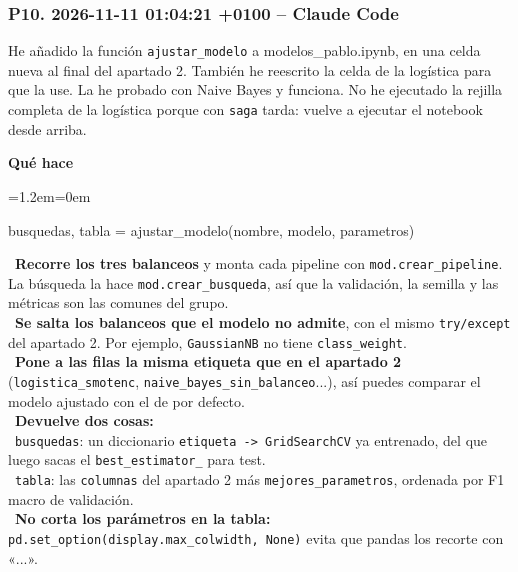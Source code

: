\documentclass[11pt,a4paper]{article}
\newenvironment{codigo}
  {\par\smallskip\begin{list}{}{\leftmargin=1.2em\rightmargin=0em}\item\relax\ttfamily\scriptsize\raggedright}
  {\end{list}\smallskip}
\begin{document}
\subsubsection*{P10. 2026-11-11 01:04:21 +0100 -- Claude Code}
{\small
He añadido la función \texttt{ajustar\_\allowbreak{}modelo} a modelos\_\allowbreak{}pablo.ipynb, en una celda nueva al final del apartado 2. También he reescrito la celda de la logística para que la use. La he probado con Naive Bayes y funciona. No he ejecutado la rejilla completa de la logística porque con \texttt{saga} tarda: vuelve a ejecutar el notebook desde arriba.

\smallskip\noindent\textbf{Qué hace}\par
\begin{codigo}
busquedas, tabla = ajustar\_\allowbreak{}modelo(nombre, modelo, parametros)
\end{codigo}
\hspace*{1.0em}\textbullet~\textbf{Recorre los tres balanceos} y monta cada pipeline con \texttt{mod.crear\_\allowbreak{}pipeline}. La búsqueda la hace \texttt{mod.crear\_\allowbreak{}busqueda}, así que la validación, la semilla y las métricas son las comunes del grupo. \\{}
\hspace*{1.0em}\textbullet~\textbf{Se salta los balanceos que el modelo no admite}, con el mismo \texttt{try/\allowbreak{}except} del apartado 2. Por ejemplo, \texttt{GaussianNB} no tiene \texttt{class\_\allowbreak{}weight}. \\{}
\hspace*{1.0em}\textbullet~\textbf{Pone a las filas la misma etiqueta que en el apartado 2} (\texttt{logistica\_\allowbreak{}smotenc}, \texttt{naive\_\allowbreak{}bayes\_\allowbreak{}sin\_\allowbreak{}balanceo}...), así puedes comparar el modelo ajustado con el de por defecto. \\{}
\hspace*{1.0em}\textbullet~\textbf{Devuelve dos cosas:} \\{}
\hspace*{2.0em}\textbullet~\texttt{busquedas}: un diccionario \texttt{etiqueta -\textgreater{} GridSearchCV} ya entrenado, del que luego sacas el \texttt{best\_\allowbreak{}estimator\_\allowbreak{}} para test. \\{}
\hspace*{2.0em}\textbullet~\texttt{tabla}: las \texttt{columnas} del apartado 2 más \texttt{mejores\_\allowbreak{}parametros}, ordenada por F1 macro de validación. \\{}
\hspace*{1.0em}\textbullet~\textbf{No corta los parámetros en la tabla:} \texttt{pd.set\_\allowbreak{}option(\textquotedbl{}display.max\_\allowbreak{}colwidth\textquotedbl{}, None)} evita que pandas los recorte con «...».

}
\end{document}
